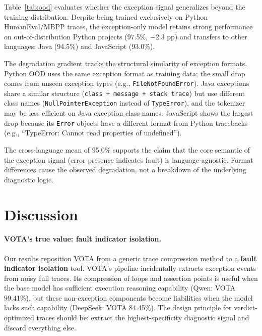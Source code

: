 \documentclass[11pt]{article}
\begin{document}
Table~\ref{tab:ood} evaluates whether the exception signal generalizes beyond the training distribution. Despite being trained exclusively on Python HumanEval/MBPP traces, the exception-only model retains strong performance on out-of-distribution Python projects (97.5\%, $-$2.3 pp) and transfers to other languages: Java (94.5\%) and JavaScript (93.0\%).

The degradation gradient tracks the structural similarity of exception formats. Python OOD uses the same exception format as training data; the small drop comes from unseen exception types (e.g., \texttt{FileNotFoundError}). Java exceptions share a similar structure (\texttt{class + message + stack trace}) but use different class names (\texttt{NullPointerException} instead of \texttt{TypeError}), and the tokenizer may be less efficient on Java exception class names. JavaScript shows the largest drop because its \texttt{Error} objects have a different format from Python tracebacks (e.g., ``TypeError: Cannot read properties of undefined'').

The cross-language mean of 95.0\% supports the claim that the core semantic of the exception signal (error presence indicates fault) is language-agnostic. Format differences cause the observed degradation, not a breakdown of the underlying diagnostic logic.

\section{Discussion}

\paragraph{VOTA's true value: fault indicator isolation.}
Our results reposition VOTA from a generic trace compression method to a \textbf{fault indicator isolation} tool. VOTA's pipeline incidentally extracts exception events from noisy full traces. Its compression of loops and assertion points is useful when the base model has sufficient execution reasoning capability (Qwen: VOTA 99.41\%), but these non-exception components become liabilities when the model lacks such capability (DeepSeek: VOTA 84.45\%). The design principle for verdict-optimized traces should be: extract the highest-specificity diagnostic signal and discard everything else.
\end{document}
